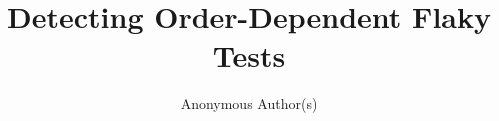 \documentclass[10pt]{article}
\begin{document}
\title{Detecting Order-Dependent Flaky Tests}
\author{Anonymous Author(s)}
\maketitle


\end{document}
